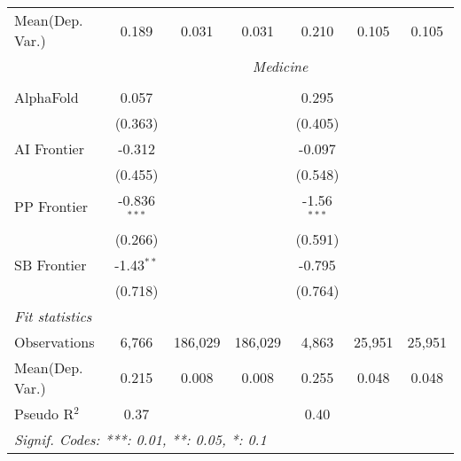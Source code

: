 \begin{tabular}{lcccccc}
Mean(Dep. Var.) & 0.189 & 0.031 & 0.031 & 0.210 & 0.105 & 0.105 \\
 & \multicolumn{6}{c}{\textit{Medicine}} \\ \\
   AlphaFold    & 0.057          &         &         & 0.295         &        &   \\   
                & (0.363)        &         &         & (0.405)       &        &   \\   
   AI Frontier  & -0.312         &         &         & -0.097        &        &   \\   
                & (0.455)        &         &         & (0.548)       &        &   \\   
   PP Frontier  & -0.836$^{***}$ &         &         & -1.56$^{***}$ &        &   \\   
                & (0.266)        &         &         & (0.591)       &        &   \\   
   SB Frontier  & -1.43$^{**}$   &         &         & -0.795        &        &   \\   
                & (0.718)        &         &         & (0.764)       &        &   \\   
   \midrule
   \emph{Fit statistics}\\
   Observations & 6,766          & 186,029 & 186,029 & 4,863         & 25,951 & 25,951\\  
Mean(Dep. Var.) & 0.215 & 0.008 & 0.008 & 0.255 & 0.048 & 0.048 \\
   Pseudo R$^2$ & 0.37           &         &         & 0.40          &        & \\  
   \midrule \midrule
   \multicolumn{7}{l}{\emph{Signif. Codes: ***: 0.01, **: 0.05, *: 0.1}}\\
\end{tabular}
\par\endgroup
